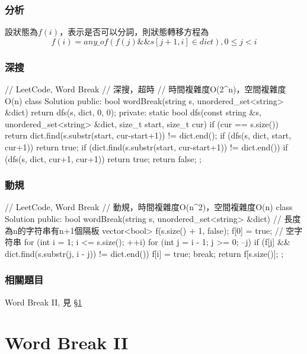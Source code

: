 \subsubsection{分析}
設狀態為$f(i)$，表示是否可以分詞，則狀態轉移方程為
$$
f(i) = any\_of(f(j) \&\& s[j+1,i] \in dict),  0 \leq j < i
$$


\subsubsection{深搜}
\begin{Code}
// LeetCode, Word Break
// 深搜，超時
// 時間複雜度O(2^n)，空間複雜度O(n)
class Solution {
public:
    bool wordBreak(string s, unordered_set<string> &dict) {
        return dfs(s, dict, 0, 0);
    }
private:
    static bool dfs(const string &s, unordered_set<string> &dict,
            size_t start, size_t cur) {
        if (cur == s.size()) {
            return dict.find(s.substr(start, cur-start+1)) != dict.end();
        }
        if (dfs(s, dict, start, cur+1)) return true;
        if (dict.find(s.substr(start, cur-start+1)) != dict.end())
            if (dfs(s, dict, cur+1, cur+1)) return true;
        return false;
    }
};
\end{Code}


\subsubsection{動規}
\begin{Code}
// LeetCode, Word Break
// 動規，時間複雜度O(n^2)，空間複雜度O(n)
class Solution {
public:
    bool wordBreak(string s, unordered_set<string> &dict) {
        // 長度為n的字符串有n+1個隔板
        vector<bool> f(s.size() + 1, false);
        f[0] = true; // 空字符串
        for (int i = 1; i <= s.size(); ++i) {
            for (int j = i - 1; j >= 0; --j) {
                if (f[j] && dict.find(s.substr(j, i - j)) != dict.end()) {
                    f[i] = true;
                    break;
                }
            }
        }
        return f[s.size()];
    }
};
\end{Code}


\subsubsection{相關題目}
\begindot
\item Word Break II, 見 \S \ref{sec:word-break-ii}
\myenddot


\section{Word Break II} %
\label{sec:word-break-ii}


